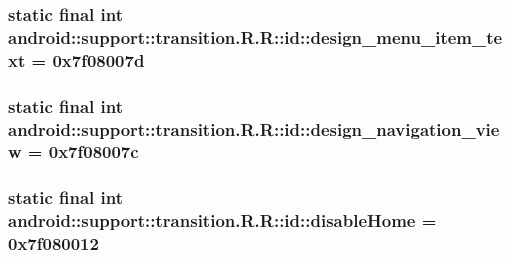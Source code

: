 \hypertarget{classandroid_1_1support_1_1transition_1_1_r_1_1id_ce28970e40507047df1c571441ed083b}{
\subsubsection[{design\_\-menu\_\-item\_\-text}]{\setlength{\rightskip}{0pt plus 5cm}static final int android::support::transition.R.R::id::design\_\-menu\_\-item\_\-text = 0x7f08007d}}
\label{classandroid_1_1support_1_1transition_1_1_r_1_1id_ce28970e40507047df1c571441ed083b}


\hypertarget{classandroid_1_1support_1_1transition_1_1_r_1_1id_c5d67e905fd55926e3eaef0cdb35c997}{
\subsubsection[{design\_\-navigation\_\-view}]{\setlength{\rightskip}{0pt plus 5cm}static final int android::support::transition.R.R::id::design\_\-navigation\_\-view = 0x7f08007c}}
\label{classandroid_1_1support_1_1transition_1_1_r_1_1id_c5d67e905fd55926e3eaef0cdb35c997}


\hypertarget{classandroid_1_1support_1_1transition_1_1_r_1_1id_b0274263a50d6337b261eb50ed0e7b0f}{
\subsubsection[{disableHome}]{\setlength{\rightskip}{0pt plus 5cm}static final int android::support::transition.R.R::id::disableHome = 0x7f080012}}
\label{classandroid_1_1support_1_1transition_1_1_r_1_1id_b0274263a50d6337b261eb50ed0e7b0f}


